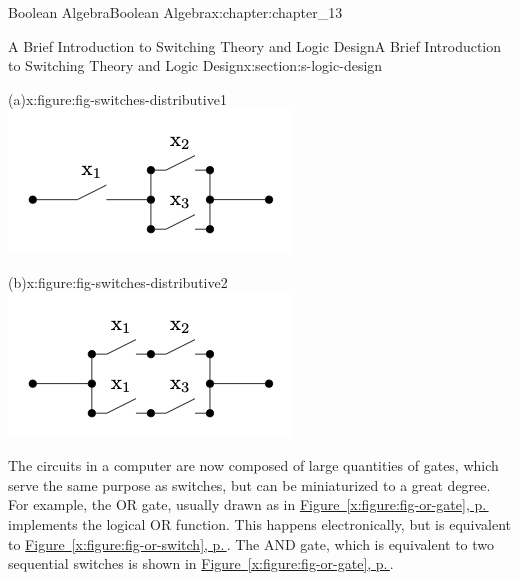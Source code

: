 \documentclass[twoside,10pt,]{book}
\newcommand{\xreffont}{\relax}
\numberwithin{equation}{section}
\begin{document}
\begin{chapterptx}{Boolean Algebra}{}{Boolean Algebra}{}{}{x:chapter:chapter_13}
\begin{sectionptx}{A Brief Introduction to Switching Theory and Logic Design}{}{A Brief Introduction to Switching Theory and Logic Design}{}{}{x:section:s-logic-design}
\begin{sidebyside}{2}{0}{0}{0}%
\begin{sbspanel}{0.5}%
\begin{figureptx}{(a)}{x:figure:fig-switches-distributive1}{}%
\includegraphics[width=\linewidth]{images/fig-switches-distributive1.png}
\tcblower
\end{figureptx}%
\end{sbspanel}%
\begin{sbspanel}{0.5}%
\begin{figureptx}{(b)}{x:figure:fig-switches-distributive2}{}%
\includegraphics[width=\linewidth]{images/fig-switches-distributive2.png}
\tcblower
\end{figureptx}%
\end{sbspanel}%
\end{sidebyside}%
\par
The circuits in a computer are now composed of large quantities of gates, which serve the same purpose as switches, but can be miniaturized to a great degree.   For example, the OR gate, usually drawn as in \hyperref[x:figure:fig-or-gate]{Figure~{\xreffont\ref{x:figure:fig-or-gate}}, p.\,\pageref{x:figure:fig-or-gate}} implements the logical OR function.  This happens electronically, but is equivalent to \hyperref[x:figure:fig-or-switch]{Figure~{\xreffont\ref{x:figure:fig-or-switch}}, p.\,\pageref{x:figure:fig-or-switch}}.  The AND gate, which is equivalent to two sequential switches is  shown in \hyperref[x:figure:fig-or-gate]{Figure~{\xreffont\ref{x:figure:fig-or-gate}}, p.\,\pageref{x:figure:fig-or-gate}}.%

\end{sectionptx}
\end{chapterptx}
\end{document}

